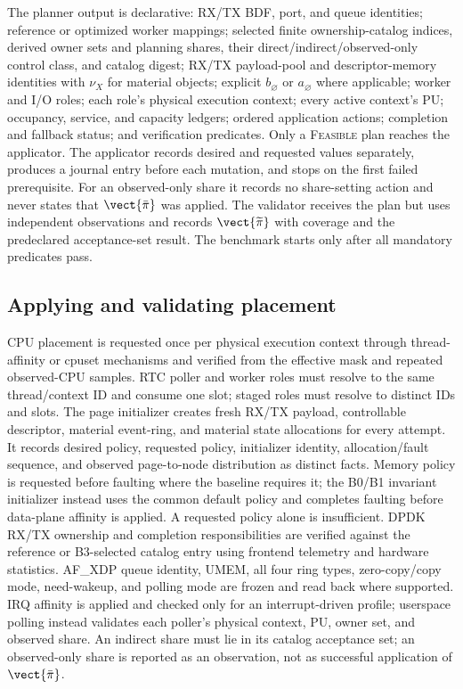 The planner output is declarative: RX/TX BDF, port, and queue identities; reference or optimized worker mappings; selected finite ownership-catalog indices, derived owner sets and planning shares, their direct/indirect/observed-only control class, and catalog digest; RX/TX payload-pool and descriptor-memory identities with $\nu_X$ for material objects; explicit $b_\varnothing$ or $a_\varnothing$ where applicable; worker and I/O roles; each role's physical execution context; every active context's PU; occupancy, service, and capacity ledgers; ordered application actions; completion and fallback status; and verification predicates. Only a \textsc{Feasible} plan reaches the applicator. The applicator records desired and requested values separately, produces a journal entry before each mutation, and stops on the first failed prerequisite. For an observed-only share it records no share-setting action and never states that $\vect{\bar\pi}$ was applied. The validator receives the plan but uses independent observations and records $\vect{\widetilde\pi}$ with coverage and the predeclared acceptance-set result. The benchmark starts only after all mandatory predicates pass.

\subsection{Applying and validating placement}

CPU placement is requested once per physical execution context through thread-affinity or cpuset mechanisms and verified from the effective mask and repeated observed-CPU samples. RTC poller and worker roles must resolve to the same thread/context ID and consume one slot; staged roles must resolve to distinct IDs and slots. The page initializer creates fresh RX/TX payload, controllable descriptor, material event-ring, and material state allocations for every attempt. It records desired policy, requested policy, initializer identity, allocation/fault sequence, and observed page-to-node distribution as distinct facts. Memory policy is requested before faulting where the baseline requires it; the B0/B1 invariant initializer instead uses the common default policy and completes faulting before data-plane affinity is applied. A requested policy alone is insufficient. DPDK RX/TX ownership and completion responsibilities are verified against the reference or B3-selected catalog entry using frontend telemetry and hardware statistics. AF\_XDP queue identity, UMEM, all four ring types, zero-copy/copy mode, need-wakeup, and polling mode are frozen and read back where supported. IRQ affinity is applied and checked only for an interrupt-driven profile; userspace polling instead validates each poller's physical context, PU, owner set, and observed share. An indirect share must lie in its catalog acceptance set; an observed-only share is reported as an observation, not as successful application of $\vect{\bar\pi}$.

